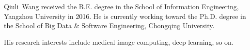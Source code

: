 \documentclass[journal]{IEEEtran}
\begin{document}


\ifCLASSOPTIONcaptionsoff
  \newpage
\fi







%





% 





\begin{IEEEbiography}{Qiuli~Wang}
    received the B.E. degree in the School of Information Engineering, Yangzhou University in 2016. He is currently working toward the Ph.D. degree in the School of Big Data \& Software Engineering, Chongqing University. 
    
    His research interests include medical image computing, deep learning, so on.
\end{IEEEbiography}
\end{document}
